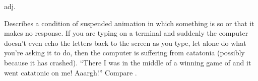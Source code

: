  adj.

Describes a condition of suspended animation in which something is so
 or  that it makes no response. If you are
typing on a terminal and suddenly the computer doesn't even echo the letters
back to the screen as you type, let alone do what you're asking it to do, then
the computer is suffering from catatonia (possibly because it has crashed).
``There I was in the middle of a winning game of  and it went
catatonic on me! Aaargh!'' Compare .


